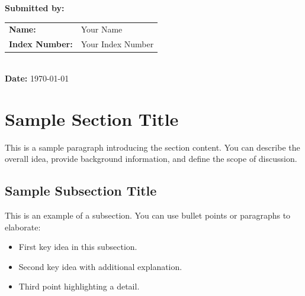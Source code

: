 \documentclass[12pt]{article}
\begin{document}
\begin{titlepage}
    \textbf{Submitted by:}\\
    \begin{tabular}{ll}
       \textbf{Name:} & Your Name \\
       \textbf{Index Number:} & Your Index Number \\
    \end{tabular}\\[1cm]
    
    \textbf{Date:} \today

    \vfill
\end{titlepage}

\newpage
\tableofcontents
\newpage




\section{Sample Section Title}
This is a sample paragraph introducing the section content.  
You can describe the overall idea, provide background information, and define the scope of discussion\cite{rayleigh1896sound}.

\subsection{Sample Subsection Title}
This is an example of a subsection.  
You can use bullet points or paragraphs to elaborate:
\begin{itemize}
    \item First key idea in this subsection.
    \item Second key idea with additional explanation.
    \item Third point highlighting a detail.
\end{itemize}
\end{document}
